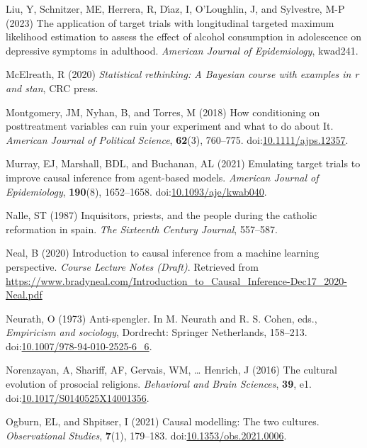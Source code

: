 \documentclass[
  single column]{article}
\newlength{\cslhangindent}
\newenvironment{CSLReferences}[2] %
 {\begin{list}{}{%
  \setlength{\itemindent}{0pt}
  \setlength{\leftmargin}{0pt}
  \setlength{\parsep}{0pt}
  \ifodd #1
   \setlength{\leftmargin}{\cslhangindent}
   \setlength{\itemindent}{-1\cslhangindent}
  \fi
  \setlength{\itemsep}{#2\baselineskip}}}
 {\end{list}}
\begin{document}
\begin{CSLReferences}{1}{0}
Liu, Y, Schnitzer, ME, Herrera, R, Dı́az, I, O'Loughlin, J, and
Sylvestre, M-P (2023) The application of target trials with longitudinal
targeted maximum likelihood estimation to assess the effect of alcohol
consumption in adolescence on depressive symptoms in adulthood.
\emph{American Journal of Epidemiology}, kwad241.

McElreath, R (2020) \emph{Statistical rethinking: A {B}ayesian course
with examples in r and stan}, CRC press.

Montgomery, JM, Nyhan, B, and Torres, M (2018) How conditioning on
posttreatment variables can ruin your experiment and what to do about
It. \emph{American Journal of Political Science}, \textbf{62}(3),
760--775.
doi:\href{https://doi.org/10.1111/ajps.12357}{10.1111/ajps.12357}.

Murray, EJ, Marshall, BDL, and Buchanan, AL (2021) Emulating target
trials to improve causal inference from agent-based models.
\emph{American Journal of Epidemiology}, \textbf{190}(8), 1652--1658.
doi:\href{https://doi.org/10.1093/aje/kwab040}{10.1093/aje/kwab040}.

Nalle, ST (1987) Inquisitors, priests, and the people during the
catholic reformation in spain. \emph{The Sixteenth Century Journal},
557--587.

Neal, B (2020) Introduction to causal inference from a machine learning
perspective. \emph{Course Lecture Notes (Draft)}. Retrieved from
\url{https://www.bradyneal.com/Introduction_to_Causal_Inference-Dec17_2020-Neal.pdf}

Neurath, O (1973) Anti-spengler. In M. Neurath and R. S. Cohen, eds.,
\emph{Empiricism and sociology}, Dordrecht: Springer Netherlands,
158--213.
doi:\href{https://doi.org/10.1007/978-94-010-2525-6_6}{10.1007/978-94-010-2525-6\_6}.

Norenzayan, A, Shariff, AF, Gervais, WM, \ldots{} Henrich, J (2016) The
cultural evolution of prosocial religions. \emph{Behavioral and Brain
Sciences}, \textbf{39}, e1.
doi:\href{https://doi.org/10.1017/S0140525X14001356}{10.1017/S0140525X14001356}.

Ogburn, EL, and Shpitser, I (2021) Causal modelling: The two cultures.
\emph{Observational Studies}, \textbf{7}(1), 179--183.
doi:\href{https://doi.org/10.1353/obs.2021.0006}{10.1353/obs.2021.0006}.


\end{CSLReferences}
\end{document}

